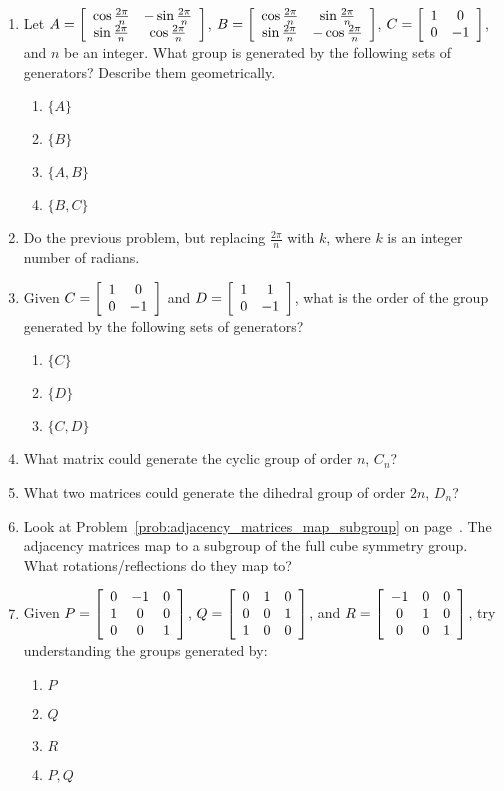 \documentclass[../gatm.tex]{subfiles}
\begin{document}
\begin{enumerate}
\item Let $A=\left[\begin{array}{cc} \cos\frac{2\pi}{n} & -\sin\frac{2\pi}{n} \\ \sin\frac{2\pi}{n} & \cos\frac{2\pi}{n} \end{array}\right]$, $B=\left[\begin{array}{cc} \cos\frac{2\pi}{n} & \sin\frac{2\pi}{n} \\ \sin\frac{2\pi}{n} & -\cos\frac{2\pi}{n} \end{array}\right]$, $C=\left[\begin{array}{cc} 1 & 0 \\ 0 & -1 \end{array}\right]$, and $n$ be an integer. What group is generated by the following sets of generators? Describe them geometrically. \begin{multicols}{4}%
\begin{enumerate}%
\item $\{A\}$
\item $\{B\}$
\item $\{A,B\}$
\item $\{B,C\}$
\end{enumerate}%
\end{multicols}%
\item Do the previous problem, but replacing $\frac{2\pi}{n}$ with $k$, where $k$ is an integer number of radians.
\item Given $C=\left[\begin{array}{cc} 1 & 0 \\ 0 & -1 \end{array}\right]$ and $D=\left[\begin{array}{cc} 1 & 1 \\ 0 & -1 \end{array}\right]$, what is the order of the group generated by the following sets of generators?
\begin{multicols}{3}
\begin{enumerate}
\item $\{C\}$
\item $\{D\}$
\item $\{C,D\}$
\end{enumerate}
\end{multicols}
\item What matrix could generate the cyclic group of order $n$, $C_n$?
\item What two matrices could generate the dihedral group of order $2n$, $D_n$?
\item Look at Problem~\ref{prob:adjacency_matrices_map_subgroup} on page~\pageref{prob:adjacency_matrices_map_subgroup}. The adjacency matrices map to a subgroup of the full cube symmetry group. What rotations/reflections do they map to?
\item Given $P=\left[\begin{array}{ccc} 0 & -1 & 0 \\ 1 & 0 & 0 \\ 0 & 0 & 1 \end{array}\right]$, $Q=\left[\begin{array}{ccc} 0 & 1 & 0 \\ 0 & 0 & 1 \\ 1 & 0 & 0 \end{array}\right]$, and $R=\left[\begin{array}{ccc} -1 & 0 & 0 \\ 0 & 1 & 0 \\ 0 & 0 & 1 \end{array}\right]$, try understanding the groups generated by:
\begin{multicols}{4}
\begin{enumerate}
\item ${P}$
\item ${Q}$
\item ${R}$
\item ${P,Q}$

\end{enumerate}
\end{multicols}
\end{enumerate}
\end{document}

